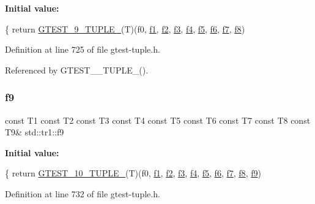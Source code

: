 {\bfseries Initial value\+:}
\begin{DoxyCode}
\{
  \textcolor{keywordflow}{return} \hyperlink{gtest-tuple_8h_a1a81c17bfe3cdceb4d56b15985a44a7e}{GTEST\_9\_TUPLE\_}(T)(f0, \hyperlink{namespacestd_1_1tr1_a9c0fa65b105f8e2f58ba59ecf75fd000}{f1}, \hyperlink{namespacestd_1_1tr1_a87dd9e009868361317f587126dba63d4}{f2}, \hyperlink{namespacestd_1_1tr1_a0f7c3b47d27d42d82d1a333ea420ce4e}{f3}, \hyperlink{namespacestd_1_1tr1_adc796e02b7385d526aff708189564f67}{f4}, \hyperlink{namespacestd_1_1tr1_a9c1eb66b2b2fa321942af95405232a0d}{f5}, \hyperlink{namespacestd_1_1tr1_a6b62f32e1e3e21bceb94eb46c4cbfd56}{f6}, 
      \hyperlink{namespacestd_1_1tr1_a2185f3a1c07f2df072c39cb91ffa89a4}{f7}, \hyperlink{namespacestd_1_1tr1_ab998afa41cea8d6d26d7e4288b0bf974}{f8})
\end{DoxyCode}


Definition at line 725 of file gtest-\/tuple.\+h.



Referenced by G\+T\+E\+S\+T\+\_\+\_\+\+T\+U\+P\+L\+E\+\_\+().

\mbox{\label{namespacestd_1_1tr1_a216d2c7cdfaaf415caba2f88e2c34413}} 
\subsubsection{\texorpdfstring{f9}{f9}}
{\footnotesize\ttfamily const T1 const T2 const T3 const T4 const T5 const T6 const T7 const T8 const T9\& std\+::tr1\+::f9}

{\bfseries Initial value\+:}
\begin{DoxyCode}
\{
  \textcolor{keywordflow}{return} \hyperlink{gtest-tuple_8h_a275e7bcd84299cc44b9c1dba971951c4}{GTEST\_10\_TUPLE\_}(T)(f0, \hyperlink{namespacestd_1_1tr1_a9c0fa65b105f8e2f58ba59ecf75fd000}{f1}, \hyperlink{namespacestd_1_1tr1_a87dd9e009868361317f587126dba63d4}{f2}, \hyperlink{namespacestd_1_1tr1_a0f7c3b47d27d42d82d1a333ea420ce4e}{f3}, \hyperlink{namespacestd_1_1tr1_adc796e02b7385d526aff708189564f67}{f4}, \hyperlink{namespacestd_1_1tr1_a9c1eb66b2b2fa321942af95405232a0d}{f5}, \hyperlink{namespacestd_1_1tr1_a6b62f32e1e3e21bceb94eb46c4cbfd56}{f6}, 
      \hyperlink{namespacestd_1_1tr1_a2185f3a1c07f2df072c39cb91ffa89a4}{f7}, \hyperlink{namespacestd_1_1tr1_ab998afa41cea8d6d26d7e4288b0bf974}{f8}, \hyperlink{namespacestd_1_1tr1_a216d2c7cdfaaf415caba2f88e2c34413}{f9})
\end{DoxyCode}


Definition at line 732 of file gtest-\/tuple.\+h.

